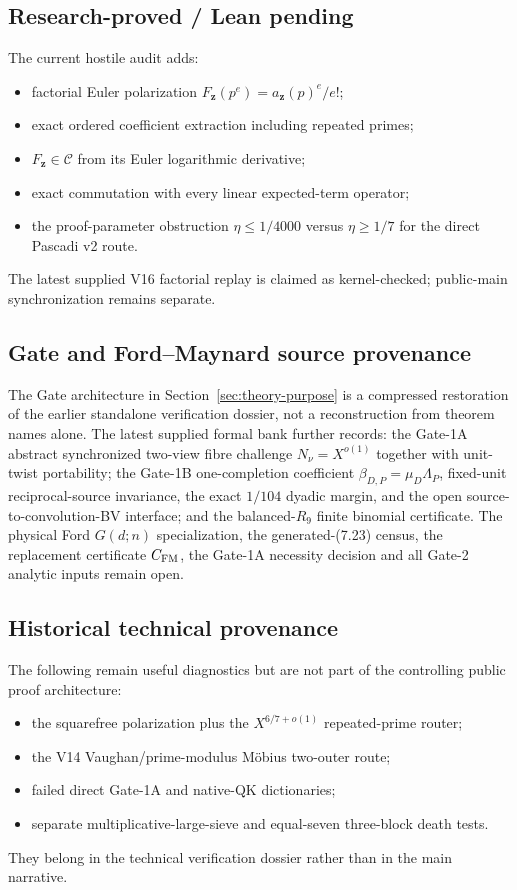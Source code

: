 \documentclass[11pt]{article}
\theoremstyle{definition}
\newcommand{\1}{\mathbf 1}
\begin{document}
{{{\subsection*{Research-proved / Lean pending}
The current hostile audit adds:
\begin{itemize}[leftmargin=1.6em,itemsep=0.35em]
\item factorial Euler polarization
  $F_{\mathbf z}(p^e)=a_{\mathbf z}(p)^e/e!$;
\item exact ordered coefficient extraction including repeated primes;
\item $F_{\mathbf z}\in\mathcal C$ from its Euler logarithmic derivative;
\item exact commutation with every linear expected-term operator;
\item the proof-parameter obstruction
  $\eta\le1/4000$ versus $\eta\ge1/7$ for the direct Pascadi v2 route.
\end{itemize}
The latest supplied V16 factorial replay is claimed as kernel-checked; public-main synchronization remains separate.

\subsection*{Gate and Ford--Maynard source provenance}
The Gate architecture in Section~\ref{sec:theory-purpose} is a compressed restoration of the earlier
standalone verification dossier, not a reconstruction from theorem names alone.  The latest supplied formal
bank further records: the Gate-1A abstract synchronized two-view fibre challenge
$N_\nu=X^{o(1)}$ together with unit-twist portability; the Gate-1B one-completion coefficient
$\beta_{D,P}=\mu_D\Lambda_P$, fixed-unit reciprocal-source invariance, the exact $1/104$ dyadic margin,
and the open source-to-convolution-BV interface; and the balanced-$R_9$ finite binomial certificate.
The physical Ford $G(d;n)$ specialization, the generated-(7.23) census, the replacement certificate
$C_{\rm FM}$, the Gate-1A necessity decision and all Gate-2 analytic inputs remain open.

\subsection*{Historical technical provenance}
The following remain useful diagnostics but are not part of the controlling public proof
architecture:
\begin{itemize}[leftmargin=1.6em,itemsep=0.35em]
\item the squarefree polarization plus the $X^{6/7+o(1)}$ repeated-prime router;
\item the V14 Vaughan/prime-modulus M\"obius two-outer route;
\item failed direct Gate-1A and native-QK dictionaries;
\item separate multiplicative-large-sieve and equal-seven three-block death tests.
\end{itemize}
They belong in the technical verification dossier rather than in the main narrative.

}}}
\end{document}
